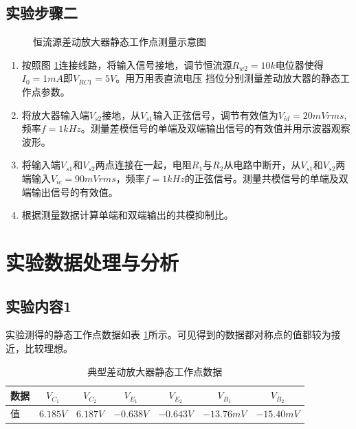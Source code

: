 \documentclass[a4paper,11pt,UTF8]{ctexart}
\begin{document}
\subsection{实验步骤二}
\begin{figure}[htbp]
  \centering
  \caption{恒流源差动放大器静态工作点测量示意图}
  \label{fig:sStatic}
  \end{figure}
\begin{enumerate}
  \item 按照图 \ref{fig:sStatic}连接线路，将输入信号接地，调节恒流源$R_{w2}=10k$电位器使得$I_0=1mA$即$V_{RC1}=5V$。用万用表直流电压
  挡位分别测量差动放大器的静态工作点参数。
  \item 将放大器输入端$V_{s2}$接地，从$V_{s1}$输入正弦信号，调节有效值为$V_{id}=20mVrms$,频率$f=1kHz$。测量差模信号的单端及双端输出信号的有效值并用示波器观察波形。
  \item 将输入端$V_{s1}$和$V_{s2}$两点连接在一起，电阻$R_1$与$R_2$从电路中断开，从$V_{s1}$和$V_{s2}$两端输入$V_{ic}=90mVrms$，频率$f=1kHz$的正弦信号。测量共模信号的单端及双端输出信号的有效值。
  \item 根据测量数据计算单端和双端输出的共模抑制比。
\end{enumerate}

\section{实验数据处理与分析}
\subsection{实验内容1}
  实验测得的静态工作点数据如表 \ref{tab:nSTab}所示。可见得到的数据都对称点的值都较为接近，比较理想。
  \begin{table}[!h!tbp]
    \caption{典型差动放大器静态工作点数据}\label{tab:nSTab}
      \centering
      \begin{tabular}{|l|c|c|c|c|c|c|}
      \hline
      数据 &$V_{C_1}$&$V_{C_2}$&$V_{E_1}$&$V_{E_2}$&$V_{B_1}$&$V_{B_2}$         \\ \hline
      值   &$6.185V$&$6.187V$&$-0.638V$&$-0.643V$&$-13.76mV$&$-15.40mV$     \\ \hline
    \end{tabular}
    \end{table}
\end{document}
